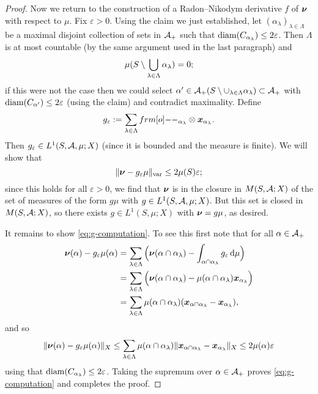 \begin{proof}
  Now we return to the construction of a Radon--Nikodym derivative $f$ of $\bm{\nu}$ with respect to $\mu$.
  Fix $\varepsilon > 0$.
  Using the claim we just established, let $(\alpha_{\lambda})_{\lambda \in \Lambda}$ be a maximal disjoint collection of sets in $\mathcal{A}_+$ such that $\operatorname{diam}(C_{\alpha_{\lambda}}) \leq 2\varepsilon$.
  Then $\Lambda$ is at most countable (by the same argument used in the last paragraph) and
  \begin{equation*}
    \mu(S \setminus \bigcup_{\lambda \in \Lambda} \alpha_{\lambda}) = 0;
  \end{equation*}
  if this were not the case then we could select $\alpha' \in \mathcal{A}_+(S \setminus \cup_{\lambda \in \Lambda} \alpha_{\lambda}) \subset \mathcal{A}_+$ with $\operatorname{diam}(C_{\alpha'}) \leq 2\varepsilon$ (using the claim) and contradict maximality.
  Define
  \begin{equation*}
    g_{\varepsilon} := \sum_{\lambda \in \Lambda} \1_{\alpha_{\lambda}} \otimes \mb{x}_{\alpha_{\lambda}}.
  \end{equation*}
  Then $g_{\varepsilon} \in L^1(S,\mathcal{A},\mu;X)$ (since it is bounded and the measure is finite).
  We will show that
  \begin{equation}\label{eq:g-computation}
    \|\bm{\nu} - g_{\varepsilon}\mu\|_{\mathrm{var}} \leq 2\mu(S)\varepsilon;
  \end{equation}
  since this holds for all $\varepsilon > 0$, we find that $\bm{\nu}$ is in the closure in $M(S,\mathcal{A};X)$ of the set of measures of the form $g\mu$ with $g \in L^1(S,\mathcal{A},\mu;X)$.
  But this set is closed in $M(S,\mathcal{A};X)$, so there exists $g \in L^1(S,\mu;X)$ with $\bm{\nu} = g\mu$, as desired.

  It remains to show \eqref{eq:g-computation}.
  To see this first note that for all $\alpha \in \mathcal{A}_+$
  \begin{equation*}
    \begin{aligned}
      \bm{\nu}(\alpha) - g_\varepsilon\mu(\alpha)
      &= \sum_{\lambda \in \Lambda} \Big(  \bm{\nu}(\alpha \cap \alpha_{\lambda}) - \int_{\alpha \cap \alpha_{\lambda}} g_{\varepsilon} \, \mathrm{d}\mu \Big) \\
      &= \sum_{\lambda \in \Lambda} \Big(  \bm{\nu}(\alpha \cap \alpha_{\lambda}) - \mu(\alpha \cap \alpha_{\lambda}) \bm{x}_{\alpha_{\lambda}} \Big) \\
      &= \sum_{\lambda \in \Lambda} \mu(\alpha \cap \alpha_{\lambda})(\bm{x}_{\alpha \cap \alpha_{\lambda}} - \bm{x}_{\alpha_{\lambda}}),
    \end{aligned}
  \end{equation*}
  and so
  \begin{equation*}
    \|\bm{\nu}(\alpha) - g_\varepsilon\mu(\alpha)\|_{X}
    \leq \sum_{\lambda \in \Lambda} \mu(\alpha \cap \alpha_{\lambda}) \|\bm{x}_{\alpha \cap \alpha_{\lambda}} - \bm{x}_{\alpha_{\lambda}}\|_{X} \leq 2\mu(\alpha)\varepsilon
  \end{equation*}
  using that $\operatorname{diam}(C_{\alpha_{\lambda}}) \leq 2\varepsilon$.
  Taking the supremum over $\alpha \in \mathcal{A}_{+}$ proves \eqref{eq:g-computation} and completes the proof.
\end{proof}

